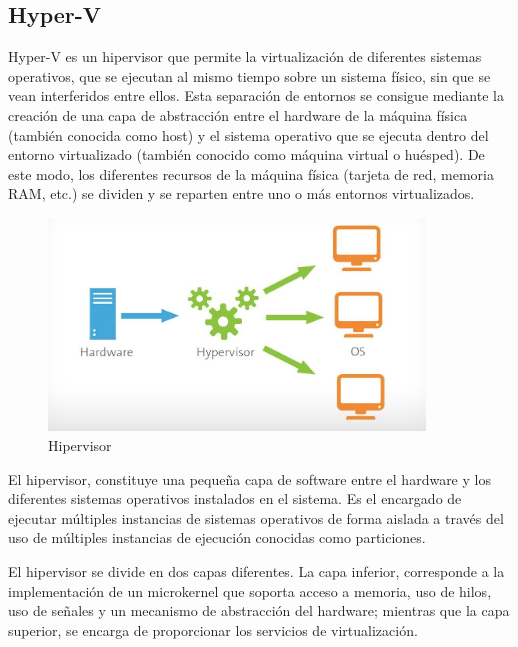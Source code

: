 \documentclass[preprint,12pt]{elsarticle}
\begin{document}
\subsection {\textbf{Hyper-V}}
Hyper-V es un hipervisor que permite la virtualización de diferentes sistemas operativos, que se ejecutan al mismo tiempo sobre un sistema físico, sin que se vean interferidos entre ellos. Esta separación de entornos se consigue mediante la creación de una capa de abstracción entre el hardware de la máquina física (también conocida como host) y el sistema operativo que se ejecuta dentro del entorno virtualizado (también conocido como máquina virtual o huésped). De este modo, los diferentes recursos de la máquina física (tarjeta de red, memoria RAM, etc.) se dividen y se reparten entre uno o más entornos virtualizados.

\begin{figure}[htb]
	\begin{center}
		\includegraphics[width=10cm]{./IMAGENES/Hyper-v} 
		\caption{Hipervisor}
	\end{center}
\end{figure}
El hipervisor, constituye una pequeña capa de software entre el hardware y los diferentes sistemas operativos instalados en el sistema. Es el encargado de ejecutar múltiples instancias de sistemas operativos de forma aislada a través del uso de múltiples instancias de ejecución conocidas como particiones.

El hipervisor se divide en dos capas diferentes. La capa inferior, corresponde a la implementación de un microkernel que soporta acceso a memoria, uso de hilos, uso de señales y un mecanismo de abstracción del hardware; mientras que la capa superior, se encarga de proporcionar los servicios de virtualización.\cite{Hyperv2019}
\end{document}
